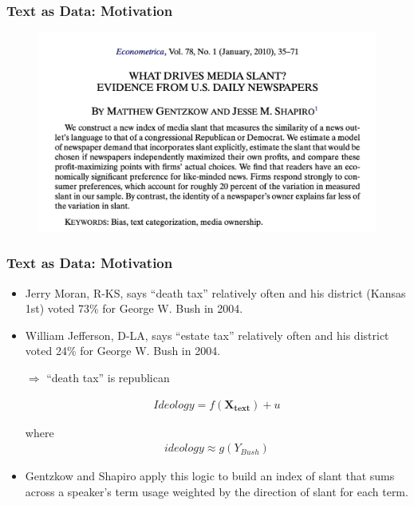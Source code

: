 \documentclass[
  shownotes,
  xcolor={svgnames},
  hyperref={colorlinks,citecolor=DarkBlue,linkcolor=DarkRed,urlcolor=DarkBlue}
  , aspectratio=169]{beamer}
\newcommand{\bm}[1]{\mathbf{#1}}
\begin{document}
\begin{frame}[fragile]
\frametitle{Text as Data: Motivation}


  \begin{figure}[H] \centering
            \captionsetup{justification=centering}
              \includegraphics[scale=0.6]{figures/gentzgow_shapiro}
              
 \end{figure}

\end{frame}
\begin{frame}[fragile]
\frametitle{Text as Data: Motivation}

\begin{itemize} 
  \item Jerry Moran, R-KS, says ``death tax'' relatively often and his district (Kansas 1st) voted 73\% for George W. Bush in 2004.

  \item William Jefferson, D-LA, says ``estate tax'' relatively often and his district voted 24\% for George W. Bush in 2004.

\medskip

$\bm{\Rightarrow}$ ``death tax'' is republican



\begin{align}
Ideology = f(\bm{X_\text{text}}) + u
\end{align}

where 
\begin{align}
ideology \approx g(Y_{Bush})
\end{align}

\item Gentzkow and Shapiro apply this logic to build an index of slant that sums across a speaker’s term usage weighted by the direction of slant for each term. 

\end{itemize}


\end{frame}
\end{document}
